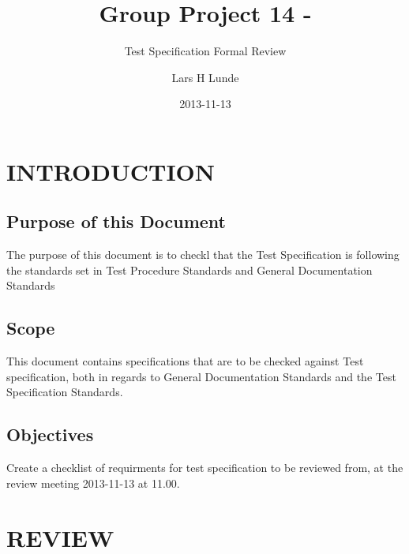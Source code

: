 \documentclass{project}
\begin{document}
\title{Group Project 14 -}
\subtitle{Test Specification Formal Review}
\author{Lars H Lunde}     
\date{2013-11-13}
\maketitle
\tableofcontents
\newpage

\section{INTRODUCTION}
\subsection{Purpose of this Document}
The purpose of this document is to checkl that the Test Specification
is following the standards set in Test Procedure Standards \cite{se.qa.06}
and General Documentation Standards \cite{se.qa.03}

\subsection{Scope}
This document contains specifications that are to be checked against 
Test specification, both in regards to General Documentation Standards
and the Test Specification Standards.

\subsection{Objectives}
Create a checklist of requirments for test specification to be reviewed from,
at the review meeting 2013-11-13 at 11.00.

\section{REVIEW}
\end{document}
